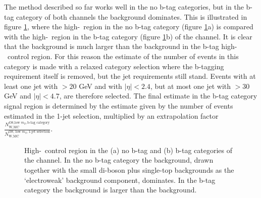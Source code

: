The method described so far works well in the no b-tag categories, but in the b-tag category of both channels
the \ttbar background dominates. This is illustrated in figure \ref{fig:bkgs_highmtctrl}, where
the high-\mT~region in the no b-tag category (figure \ref{fig:bkgs_highmtctrl}a) is compared with the high-\mT~region in the 
b-tag category (figure \ref{fig:bkgs_highmtctrl}b) of the \etau channel. It is clear that the \ttbar 
background is much larger than the \Wjets background in the b-tag high-\mT~control region.
For this reason the estimate of the number
of \Wjets events in this category is made with a relaxed category selection where the b-tagging
requirement itself is removed, but the jet requirements still stand. Events with at least one 
jet with \pT$>20$ GeV and with $|\eta|<2.4$, but at most one jet with \pT$>30$ GeV and $|\eta|<4.7$, are therefore selected. The final \Wjets estimate in the b-tag category signal
region is determined by the estimate given by the number of \Wjets events
estimated in the 1-jet selection, multiplied by an extrapolation factor 
$\frac{N_{\text{W,MC}}^{\text{OS,low } m_{T},\text{b-tag category}}}{N_{\text{W,MC}}^{\text{OS, low }m_{\text{T}},\text{1-jet selection}}}$.
\begin{figure}[h!]
\begin{center}
\end{center}
\caption[High-\mT~control region in the no b-tag and b-tag
categories of the \etau channel.]{High-\mT~control region in the (a) no b-tag and (b) b-tag categories of the \etau
channel. In the no b-tag category the \Wjets background, drawn together with the small
 di-boson plus single-top backgrounds as the `electroweak' background component, dominates. In the b-tag
category the \ttbar background is larger than the \Wjets background.}
\label{fig:bkgs_highmtctrl}
\end{figure}

